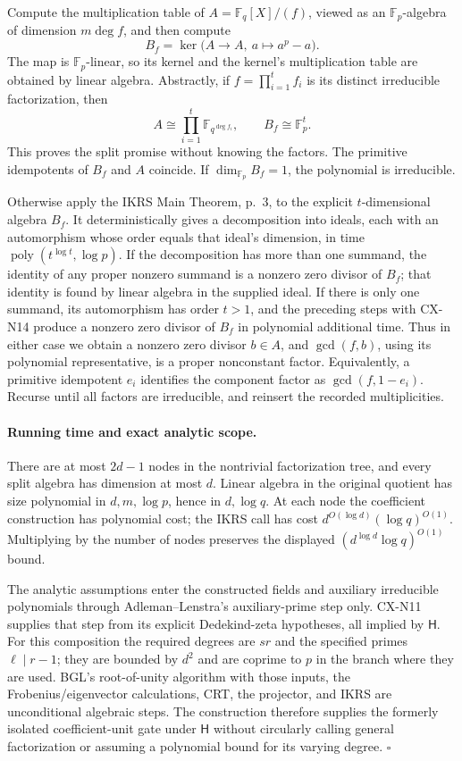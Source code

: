 Compute the multiplication table of
\(A=\mathbb F_q[X]/(f)\), viewed as an
\(\mathbb F_p\)-algebra of dimension \(m\deg f\), and then
compute
\[
 B_f=\ker\bigl(A\longrightarrow A,\ a\longmapsto a^p-a\bigr).
\]
The map is \(\mathbb F_p\)-linear, so its kernel and the kernel's
multiplication table are obtained by linear algebra.
Abstractly, if \(f=\prod_{i=1}^t f_i\) is its distinct
irreducible factorization, then
\[
 A\cong\prod_{i=1}^t\mathbb F_{q^{\deg f_i}},
 \qquad B_f\cong\mathbb F_p^t.
\]
This proves the split promise without knowing the factors.
The primitive idempotents of \(B_f\) and \(A\) coincide.
If \(\dim_{\mathbb F_p}B_f=1\), the polynomial is irreducible.

Otherwise apply the IKRS Main Theorem, p.~3, to the explicit
\(t\)-dimensional algebra \(B_f\).
It deterministically gives a decomposition into ideals, each
with an automorphism whose order equals that ideal's dimension,
in time \(\operatorname{poly}(t^{\log t},\log p)\).
If the decomposition has more than one summand, the identity of
any proper nonzero summand is a nonzero zero divisor of \(B_f\);
that identity is found by linear algebra in the supplied ideal.
If there is only one summand, its automorphism has order
\(t>1\), and the preceding steps with CX-N14 produce a nonzero
zero divisor of \(B_f\) in polynomial additional time.
Thus in either case we obtain a nonzero zero divisor \(b\in A\),
and \(\gcd(f,b)\), using its polynomial representative, is a
proper nonconstant factor.
Equivalently, a primitive idempotent \(e_i\) identifies the
component factor as \(\gcd(f,1-e_i)\).
Recurse until all factors are irreducible, and reinsert the
recorded multiplicities.

\paragraph{Running time and exact analytic scope.}
There are at most \(2d-1\) nodes in the nontrivial factorization
tree, and every split algebra has dimension at most \(d\).
Linear algebra in the original quotient has size polynomial in
\(d,m,\log p\), hence in \(d,\log q\).
At each node the coefficient construction has polynomial cost;
the IKRS call has cost
\(d^{O(\log d)}(\log q)^{O(1)}\).
Multiplying by the number of nodes preserves the displayed
\((d^{\log d}\log q)^{O(1)}\) bound.

The analytic assumptions enter the constructed fields and
auxiliary irreducible polynomials through Adleman--Lenstra's
auxiliary-prime step only. CX-N11 supplies that step from its
explicit Dedekind-zeta hypotheses, all implied by \(\mathsf H\).
For this composition the required degrees are \(sr\) and the
specified primes \(\ell\mid r-1\); they are bounded by \(d^2\)
and are coprime to \(p\) in the branch where they are used.
BGL's root-of-unity algorithm with those inputs, the
Frobenius/eigenvector calculations, CRT, the projector, and IKRS
are unconditional algebraic steps.
The construction therefore supplies the formerly isolated
coefficient-unit gate under \(\mathsf H\) without circularly
calling general factorization or assuming a polynomial bound
for its varying degree.
\hfill\(\square\)

